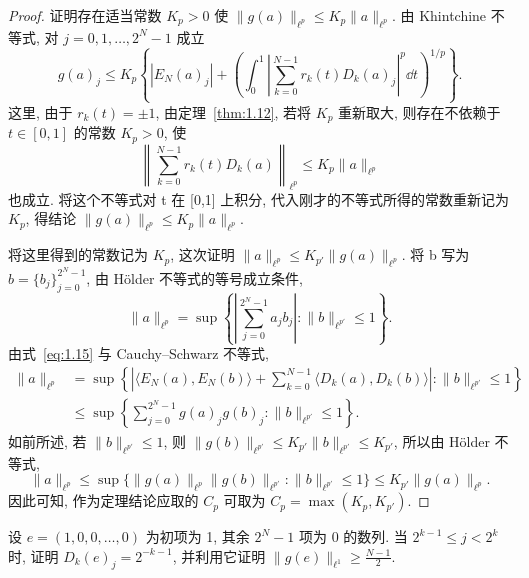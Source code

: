 \begin{proof}
证明存在适当常数 $K_{p} > 0$ 使 $\|g(a)\|_{\ell^{p}} \leq K_{p}\|a\|_{\ell^{p}}$. 由 Khintchine 不等式, 对 $j = 0, 1, \ldots, 2^{N}-1$ 成立
\[
g(a)_{j} \leq K_{p}\left\{|E_{N}(a)_{j}| + \left(\int_{0}^{1}\left|\sum_{k=0}^{N-1}r_{k}(t)D_{k}(a)_{j}\right|^{p}\dd t\right)^{1/p}\right\}.
\]
这里, 由于 $r_{k}(t) = \pm 1$, 由定理~\ref{thm:1.12}, 若将 $K_{p}$ 重新取大, 则存在不依赖于 $t \in [0,1]$ 的常数 $K_{p} > 0$, 使
\[
\left\|\sum_{k=0}^{N-1}r_{k}(t)D_{k}(a)\right\|_{\ell^{p}} \leq K_{p}\|a\|_{\ell^{p}}
\]
也成立. 将这个不等式对 t 在 [0,1] 上积分, 代入刚才的不等式所得的常数重新记为 $K_{p}$, 得结论 $\|g(a)\|_{\ell^{p}} \leq K_{p}\|a\|_{\ell^{p}}$.

将这里得到的常数记为 $K_{p}$, 这次证明 $\|a\|_{\ell^{p}} \leq K_{p'}\|g(a)\|_{\ell^{p}}$. 将 b 写为 $b = \{b_{j}\}_{j=0}^{2^{N}-1}$, 由 Hölder 不等式的等号成立条件,
\[
\|a\|_{\ell^{p}} = \sup\left\{\left|\sum_{j=0}^{2^{N}-1}a_{j}b_{j}\right| : \|b\|_{\ell^{p'}} \leq 1\right\}.
\]
由式~\eqref{eq:1.15} 与 Cauchy--Schwarz 不等式,
\begin{align*}
\|a\|_{\ell^{p}} &= \sup\left\{\left|\langle E_{N}(a), E_{N}(b)\rangle + \sum_{k=0}^{N-1}\langle D_{k}(a), D_{k}(b)\rangle\right| : \|b\|_{\ell^{p'}} \leq 1\right\} \\
&\leq \sup\left\{\sum_{j=0}^{2^{N}-1}g(a)_{j}g(b)_{j} : \|b\|_{\ell^{p'}} \leq 1\right\}.
\end{align*}
如前所述, 若 $\|b\|_{\ell^{p'}} \leq 1$, 则 $\|g(b)\|_{\ell^{p'}} \leq K_{p'}\|b\|_{\ell^{p'}} \leq K_{p'}$, 所以由 Hölder 不等式,
\[
\|a\|_{\ell^{p}} \leq \sup\{\|g(a)\|_{\ell^{p}}\|g(b)\|_{\ell^{p'}} : \|b\|_{\ell^{p'}} \leq 1\} \leq K_{p'}\|g(a)\|_{\ell^{p}}.
\]
因此可知, 作为定理结论应取的 $C_{p}$ 可取为 $C_{p} = \max(K_{p}, K_{p'})$.
\end{proof}

\begin{exercise}\label{exer:1.26}
设 $e = (1, 0, 0, \ldots, 0)$ 为初项为 1, 其余 $2^{N}-1$ 项为 0 的数列. 当 $2^{k-1} \leq j < 2^{k}$ 时, 证明 $D_{k}(e)_{j} = 2^{-k-1}$, 并利用它证明 $\|g(e)\|_{\ell^{1}} \geq \frac{N-1}{2}$.
\end{exercise}
